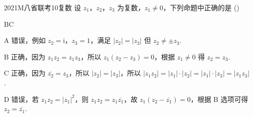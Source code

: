 
\begin{problem}{2021}{M}{八省联考}{10}{复数}
设 $ z_1 $，$ z_2 $，$ z_3 $ 为复数，$ z_1 \neq 0 $，下列命题中正确的是 (\hspace{1cm})
\begin{choices}
\end{choices}
\end{problem}

\begin{answer}
BC
\end{answer}

\begin{solutions}
A 错误，例如 $ z_2 = \mathrm{i} $，$ z_3 = 1 $，满足 $ |z_2| = |z_3| $ 但 $ z_2 \neq \pm z_3 $.  

B 正确，因为 $ z_1 z_2 = z_1 z_3 $，所以 $ z_1 (z_2 - z_3) = 0 $，根据 $ z_1 \neq 0 $ 得 $ z_2 = z_3 $.  

C 正确，因为 $ \overline{z_2} = z_3 $，所以 $ |z_2| = |z_3| $，所以 $ |z_1 z_2| = |z_1| \cdot |z_2| = |z_1| \cdot |z_3| = |z_1 z_3| $.  

D 错误，若 $ z_1 z_2 = |z_1|^2 $，则 $ z_1 z_2 = z_1 \overline{z_1} $，故 $ z_1 (z_2 - \overline{z_1}) = 0 $，根据 B 选项可得 $ z_2 = \overline{z_1} $.
\end{solutions}
